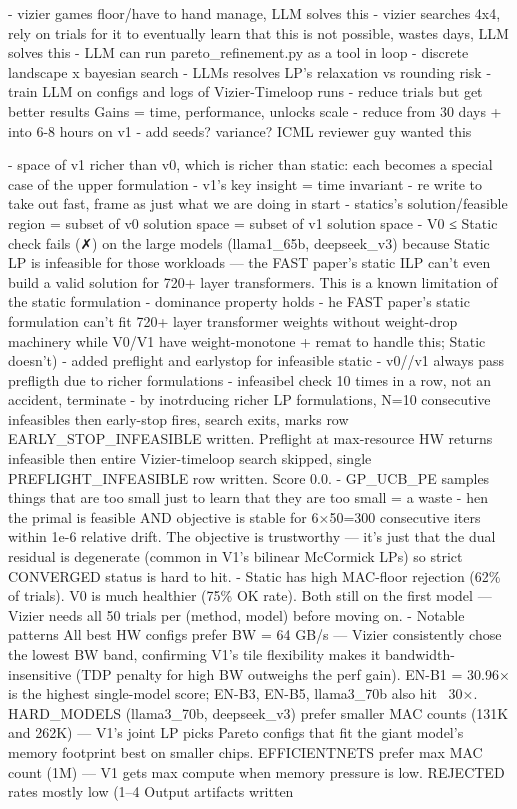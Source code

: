 - vizier games floor/have to hand manage, LLM solves this
- vizier searches 4x4, rely on trials for it to eventually learn that this is not possible, wastes days, LLM solves this
- LLM can run pareto\_refinement.py as a tool in loop
- discrete landscape x bayesian search 
- LLMs resolves LP's relaxation vs rounding risk
- train LLM on configs and logs of Vizier-Timeloop runs
- reduce trials but get better results
Gains = time, performance, unlocks scale
- reduce from 30 days + into 6-8 hours on v1 
- add seeds? variance? ICML reviewer guy wanted this

- space of v1 richer than v0, which is richer than static: each becomes a special case of the upper formulation 
- v1's key insight = time invariant 
- re write to take out fast, frame as just what we are doing in start 
- statics's solution/feasible region = subset of v0 solution space = subset of v1 solution space
- V0 ≤ Static check fails (✗) on the large models (llama1\_65b, deepseek\_v3) because Static LP is infeasible for those workloads — the FAST paper's static ILP can't even build a valid solution for 720+ layer transformers. This is a known limitation of the static formulation
- dominance property holds
- he FAST paper's static formulation can't fit 720+ layer transformer weights without weight-drop machinery while V0/V1 have weight-monotone + remat to handle this; Static doesn't)
- added preflight and earlystop for infeasible static 
- v0//v1 always pass prefligth due to richer formulations 
- infeasibel check 10 times in a row, not an accident, terminate
- by inotrducing richer LP formulations, 
N=10 consecutive infeasibles then early-stop fires, search exits, marks row EARLY\_STOP\_INFEASIBLE written.
Preflight at max-resource HW returns infeasible then entire Vizier-timeloop search skipped, single PREFLIGHT\_INFEASIBLE row written. Score 0.0.
- GP\_UCB\_PE samples things that are too small just to learn that they are too small =  a waste 
- hen the primal is feasible AND objective is stable for 6×50=300 consecutive iters within 1e-6 relative drift. The objective is trustworthy — it's just that the dual residual is degenerate (common in V1's bilinear McCormick LPs) so strict CONVERGED status is hard to hit.
- Static has high MAC-floor rejection (62\% of trials). V0 is much healthier (75\% OK rate). Both still on the first model — Vizier needs all 50 trials per (method, model) before moving on.
- Notable patterns
All best HW configs prefer BW = 64 GB/s — Vizier consistently chose the lowest BW band, confirming V1's tile flexibility makes it bandwidth-insensitive (TDP penalty for high BW outweighs the perf gain).
EN-B1 = 30.96× is the highest single-model score; EN-B3, EN-B5, llama3_70b also hit ~30×.
HARD\_MODELS (llama3_70b, deepseek_v3) prefer smaller MAC counts (131K and 262K) — V1's joint LP picks Pareto configs that fit the giant model's memory footprint best on smaller chips.
EFFICIENTNETS prefer max MAC count (1M) — V1 gets max compute when memory pressure is low.
REJECTED rates mostly low (1–4%
Output artifacts written

